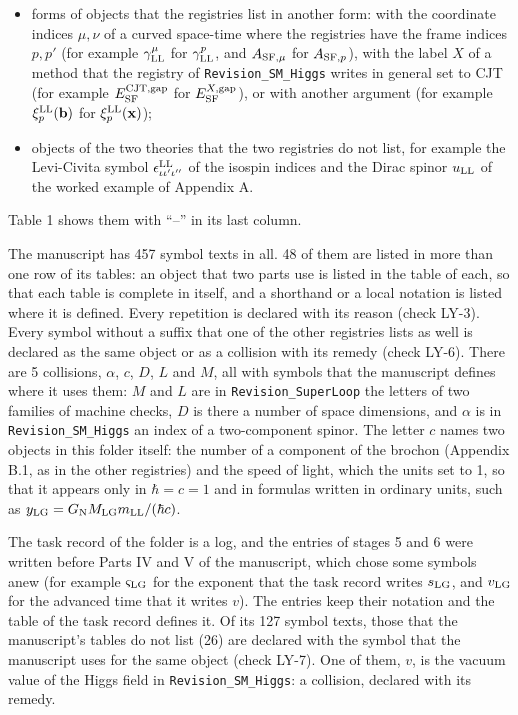 \documentclass[
  10pt,
]{article}
\providecommand{\tightlist}{%
  \setlength{\itemsep}{0pt}\setlength{\parskip}{0pt}}
\begin{document}
\begin{itemize}
\tightlist
\item
  forms of objects that the registries list in another form: with the
  coordinate indices \(\mu,\nu\) of a curved space-time where the
  registries have the frame indices \(p,p'\) (for example
  \(\gamma^\mu_{\rm LL}\) for \(\gamma^p_{\rm LL}\), and
  \(A_{{\rm SF},\mu}\) for \(A_{{\rm SF},p}\)), with the label \(X\) of
  a method that the registry of \texttt{Revision\_SM\_Higgs} writes in
  general set to CJT (for example \(E^{\rm CJT,gap}_{\rm SF}\) for
  \(E^{X,{\rm gap}}_{\rm SF}\)), or with another argument (for example
  \(\xi^{\rm LL}_p(\mathbf b)\) for \(\xi^{\rm LL}_p(\mathbf x)\));
\item
  objects of the two theories that the two registries do not list, for
  example the Levi-Civita symbol
  \(\epsilon^{\rm LL}_{\iota\iota'\iota''}\) of the isospin indices and
  the Dirac spinor \(u_{\rm LL}\) of the worked example of Appendix A.
\end{itemize}

Table 1 shows them with ``--'' in its last column.

The manuscript has 457 symbol texts in all. 48 of them are listed in
more than one row of its tables: an object that two parts use is listed
in the table of each, so that each table is complete in itself, and a
shorthand or a local notation is listed where it is defined. Every
repetition is declared with its reason (check LY-3). Every symbol
without a suffix that one of the other registries lists as well is
declared as the same object or as a collision with its remedy (check
LY-6). There are 5 collisions, \(\alpha\), \(c\), \(D\), \(L\) and
\(M\), all with symbols that the manuscript defines where it uses them:
\(M\) and \(L\) are in \texttt{Revision\_SuperLoop} the letters of two
families of machine checks, \(D\) is there a number of space dimensions,
and \(\alpha\) is in \texttt{Revision\_SM\_Higgs} an index of a
two-component spinor. The letter \(c\) names two objects in this folder
itself: the number of a component of the brochon (Appendix B.1, as in
the other registries) and the speed of light, which the units set to 1,
so that it appears only in \(\hbar=c=1\) and in formulas written in
ordinary units, such as
\(y_{\rm LG}=G_{\rm N}M_{\rm LG}m_{\rm LL}/(\hbar c)\).

The task record of the folder is a log, and the entries of stages 5 and
6 were written before Parts IV and V of the manuscript, which chose some
symbols anew (for example \(\varsigma_{\rm LG}\) for the exponent that
the task record writes \(s_{\rm LG}\), and \(v_{\rm LG}\) for the
advanced time that it writes \(v\)). The entries keep their notation and
the table of the task record defines it. Of its 127 symbol texts, those
that the manuscript's tables do not list (26) are declared with the
symbol that the manuscript uses for the same object (check LY-7). One of
them, \(v\), is the vacuum value of the Higgs field in
\texttt{Revision\_SM\_Higgs}: a collision, declared with its remedy.
\end{document}
